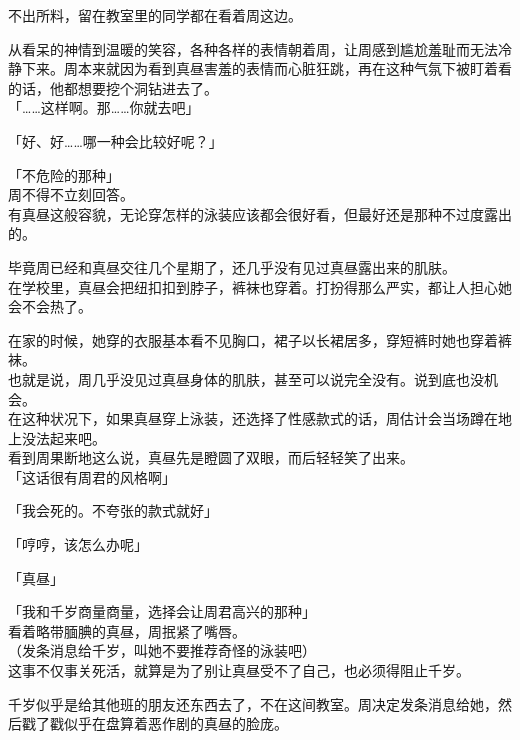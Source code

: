 不出所料，留在教室里的同学都在看着周这边。

从看呆的神情到温暖的笑容，各种各样的表情朝着周，让周感到尴尬羞耻而无法冷静下来。周本来就因为看到真昼害羞的表情而心脏狂跳，再在这种气氛下被盯着看的话，他都想要挖个洞钻进去了。\\

「……这样啊。那……你就去吧」

「好、好……哪一种会比较好呢？」

「不危险的那种」\\

周不得不立刻回答。\\

有真昼这般容貌，无论穿怎样的泳装应该都会很好看，但最好还是那种不过度露出的。

毕竟周已经和真昼交往几个星期了，还几乎没有见过真昼露出来的肌肤。\\

在学校里，真昼会把纽扣扣到脖子，裤袜也穿着。打扮得那么严实，都让人担心她会不会热了。

在家的时候，她穿的衣服基本看不见胸口，裙子以长裙居多，穿短裤时她也穿着裤袜。\\

也就是说，周几乎没见过真昼身体的肌肤，甚至可以说完全没有。说到底也没机会。\\

在这种状况下，如果真昼穿上泳装，还选择了性感款式的话，周估计会当场蹲在地上没法起来吧。\\

看到周果断地这么说，真昼先是瞪圆了双眼，而后轻轻笑了出来。\\

「这话很有周君的风格啊」

「我会死的。不夸张的款式就好」

「哼哼，该怎么办呢」

「真昼」

「我和千岁商量商量，选择会让周君高兴的那种」\\

看着略带腼腆的真昼，周抿紧了嘴唇。\\

（发条消息给千岁，叫她不要推荐奇怪的泳装吧）\\

这事不仅事关死活，就算是为了别让真昼受不了自己，也必须得阻止千岁。

千岁似乎是给其他班的朋友还东西去了，不在这间教室。周决定发条消息给她，然后戳了戳似乎在盘算着恶作剧的真昼的脸庞。
